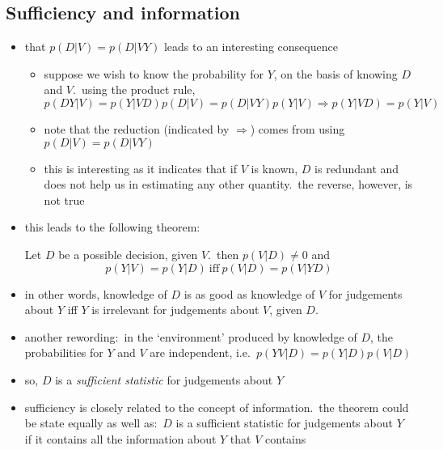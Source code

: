 \documentclass[../jaynes_prob_theory_notes.tex]{subfiles}
\begin{document}
        \subsection{Sufficiency and information}
            \begin{itemize} 
                \item that \(p(D|V) = p(D|VY)\) leads to an interesting consequence
                    \begin{itemize} 
                        \item suppose we wish to know the probability for \(Y\), on the basis of knowing \(D\) and \(V\).\ using the product rule,
                            \begin{equation*} 
                                p(DY|V) = p(Y|VD)p(D|V) = p(D|VY)p(Y|V) \Rightarrow p(Y|VD) = p(Y|V)
                            \end{equation*}
                        \item note that the reduction (indicated by \(\Rightarrow\)) comes from using \(p(D|V) = p(D|VY)\)
                        \item this is interesting as it indicates that if \(V\) is known, \(D\) is redundant and does not help us in estimating any other quantity.\ the reverse, however, is not true
                    \end{itemize}
                \item this leads to the following theorem:
                    \begin{theorem}
                        Let \(D\) be a possible decision, given \(V\).\ then \(p(V|D) \neq 0\) and
                            \begin{equation*} 
                                p(Y|V) = p(Y|D)~\text{iff}~p(V|D) = p(V|YD)
                            \end{equation*}
                    \end{theorem}
                \item in other words, knowledge of \(D\) is as good as knowledge of \(V\) for judgements about \(Y\) iff \(Y\) is irrelevant for judgements about \(V\), given \(D\).
                \item another rewording:\ in the `environment' produced by knowledge of \(D\), the probabilities for \(Y\) and \(V\) are independent, i.e.\ \(p(YV|D) = p(Y|D)p(V|D)\)
                \item so, \(D\) is a \textit{sufficient statistic} for judgements about \(Y\)
                \item sufficiency is closely related to the concept of information.\ the theorem could be state equally as well as:\ \(D\) is a sufficient statistic for judgements about \(Y\) if it contains all the information about \(Y\) that \(V\) contains

\end{itemize}
\end{document}
